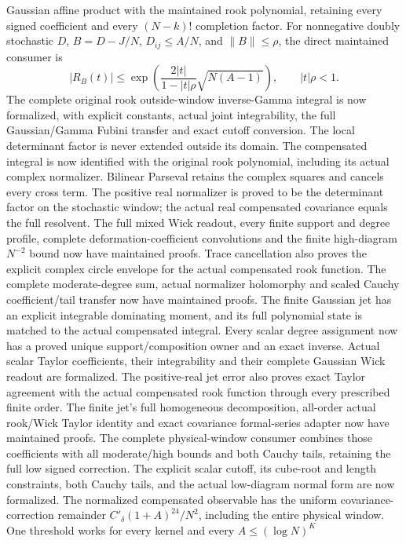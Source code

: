 \documentclass[11pt]{article}
\theoremstyle{remark}
\begin{document}
Gaussian affine product with the maintained rook polynomial, retaining
every signed coefficient and every \((N-k)!\) completion factor.
For nonnegative doubly stochastic \(D\), \(B=D-J/N\),
\(D_{ij}\leq A/N\), and \(\|B\|\leq\rho\), the direct maintained consumer is
\[
 |R_B(t)|\leq
 \exp\!\left(\frac{2|t|}{1-|t|\rho}\sqrt{N(A-1)}\right),
 \qquad |t|\rho<1.
\]
The complete original rook outside-window inverse-Gamma integral is
now formalized, with explicit constants, actual joint integrability,
the full Gaussian/Gamma Fubini transfer and exact cutoff conversion.
The local determinant factor is never extended outside its domain.
The compensated integral is now identified with the original rook polynomial,
including its actual complex normalizer. Bilinear Parseval retains the
complex squares and cancels every cross term. The positive real normalizer
is proved to be the determinant factor on the stochastic window; the actual
real compensated covariance equals the full resolvent.
The full mixed Wick readout, every finite support and degree profile,
complete deformation-coefficient convolutions and the finite high-diagram
\(N^{-2}\) bound now have maintained proofs. Trace cancellation also proves
the explicit complex circle envelope for the actual compensated rook function.
The complete moderate-degree sum, actual normalizer holomorphy and scaled
Cauchy coefficient/tail transfer now have maintained proofs.
The finite Gaussian jet has an explicit integrable dominating moment,
and its full polynomial state is matched to the actual compensated integral.
Every scalar degree assignment now has a proved unique support/composition
owner and an exact inverse. Actual scalar Taylor coefficients, their
integrability and their complete Gaussian Wick readout are formalized.
The positive-real jet error also proves exact Taylor agreement with the
actual compensated rook function through every prescribed finite order.
The finite jet's full homogeneous decomposition, all-order actual
rook/Wick Taylor identity and exact covariance formal-series adapter now
have maintained proofs. The complete physical-window consumer combines
those coefficients with all moderate/high bounds and both Cauchy tails,
retaining the full low signed correction. The explicit scalar cutoff,
its cube-root and length constraints, both Cauchy tails, and the actual
low-diagram normal form are now formalized. The normalized compensated
observable has the uniform covariance-correction remainder
\(C'_\delta(1+A)^{24}/N^2\), including the entire physical window.
One threshold works for every kernel and every \(A\le(\log N)^K\)
\end{document}
